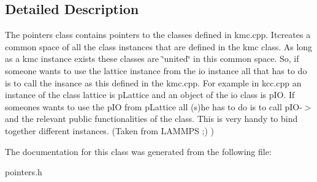 \subsection{Detailed Description}
The pointers class contains pointers to the classes defined in kmc.\+cpp. Itcreates a common space of all the class instances that are defined in the kmc class. As long as a kmc instance exists these classes are \char`\"{}united\char`\"{} in this common space. So, if someone wants to use the lattice instance from the io instance all that has to do is to call the insance as this defined in the kmc.\+cpp. For example in kcc.\+cpp an instance of the class lattice is p\+Lattice and an object of the io class is p\+IO. If someones wants to use the p\+IO from p\+Lattice all (s)he has to do is to call p\+I\+O-\/$>$ and the relevant public functionalities of the class. This is very handy to bind together different instances. (Taken from L\+A\+M\+M\+PS ;) ) 

The documentation for this class was generated from the following file\+:\begin{DoxyCompactItemize}
\item 
pointers.\+h\end{DoxyCompactItemize}
